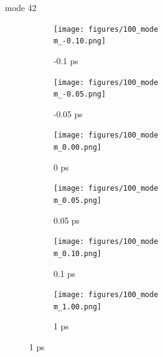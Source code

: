 \documentclass{beamer}
\newcommand\w{0.32}
\begin{document}
\renewcommand\m{42}
\begin{frame}{mode \m}
	\begin{figure}
		\centering
		\begin{subfigure}[b]{\w\textwidth}
			\centering
			\texttt{[image: figures/100\_mode\\m\_-0.10.png]}
			\caption{-0.1 ps}
		\end{subfigure}
		\begin{subfigure}[b]{\w\textwidth}
			\centering
			\texttt{[image: figures/100\_mode\\m\_-0.05.png]}
			\caption{-0.05 ps}
		\end{subfigure}
		\begin{subfigure}[b]{\w\textwidth}
			\centering
			\texttt{[image: figures/100\_mode\\m\_0.00.png]}
			\caption{0 ps}
		\end{subfigure}
		\begin{subfigure}[b]{\w\textwidth}
			\centering
			\texttt{[image: figures/100\_mode\\m\_0.05.png]}
			\caption{0.05 ps}
		\end{subfigure}
		\begin{subfigure}[b]{\w\textwidth}
			\centering
			\texttt{[image: figures/100\_mode\\m\_0.10.png]}
			\caption{0.1 ps}
		\end{subfigure}
		\begin{subfigure}[b]{\w\textwidth}
			\centering
			\texttt{[image: figures/100\_mode\\m\_1.00.png]}
			\caption{1 ps}
		\end{subfigure}
	\end{figure}
\end{frame}
\end{document}
